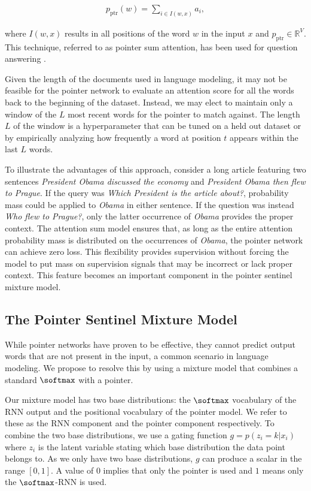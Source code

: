\begin{align} \label{eq:pointerprob}
p_{\text{ptr}}(w) = \sum_{i \in I(w, x)} a_i,
\end{align}

where $I(w, x)$ results in all positions of the word $w$ in the input $x$ and $p_{\text{ptr}} \in \mathbb{R}^V$.
This technique, referred to as pointer sum attention, has been used for question answering \cite{Kadlec2016}.

Given the length of the documents used in language modeling, it may not be feasible for the pointer network to evaluate an attention score for all the words back to the beginning of the dataset. Instead, we may elect to maintain only a window of the $L$ most recent words for the pointer to match against. The length $L$ of the window is a hyperparameter that can be tuned on a held out dataset or by empirically analyzing how frequently a word at position $t$ appears within the last $L$ words.

To illustrate the advantages of this approach, consider a long article featuring two sentences \emph{President Obama discussed the economy} and \emph{President Obama then flew to Prague}. If the query was \emph{Which President is the article about?}, probability mass could be applied to \emph{Obama} in either sentence. If the question was instead \emph{Who flew to Prague?}, only the latter occurrence of \emph{Obama} provides the proper context. The attention sum model ensures that, as long as the entire attention probability mass is distributed on the occurrences of \emph{Obama}, the pointer network can achieve zero loss. This flexibility provides supervision without forcing the model to put mass on supervision signals that may be incorrect or lack proper context. This feature becomes an important component in the pointer sentinel mixture model.

\subsection{The Pointer Sentinel Mixture Model}

While pointer networks have proven to be effective, they cannot predict output words that are not present in the input, a common scenario in language modeling. We propose to resolve this by using a mixture model that combines a standard $\softmax$ with a pointer.

Our mixture model has two base distributions: the $\softmax$ vocabulary of the RNN output and the positional vocabulary of the pointer model. We refer to these as the RNN component and the pointer component respectively. To combine the two base distributions, we use a gating function $g = p(z_i = k|x_i)$ where $z_i$ is the latent variable stating which base distribution the data point belongs to. As we only have two base distributions, $g$ can produce a scalar in the range $[0, 1]$. A value of $0$ implies that only the pointer is used and $1$ means only the $\softmax$-RNN is used.

